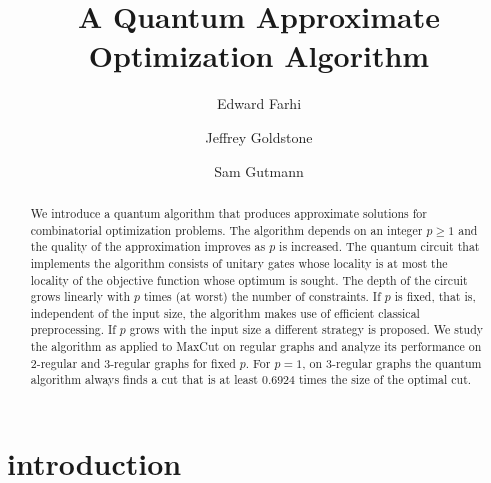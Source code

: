 \documentclass[t11pt,reprint,preprint,preprintnumbers]{revtex4}
\begin{document}
\title{A  Quantum Approximate Optimization Algorithm}
\author{Edward Farhi}
\author{Jeffrey Goldstone}
\author{Sam Gutmann}



\begin{abstract}
We introduce a quantum algorithm that produces approximate solutions for combinatorial optimization problems.  The algorithm depends on an integer $p \geq1$ and the quality of the approximation improves as $p$ is increased. The quantum circuit that implements the algorithm consists of unitary gates whose locality is at most the locality of the objective function whose optimum is sought.  The depth of the circuit grows linearly with $p$ times (at worst) the number of constraints.  If $p$ is fixed, that is, independent of the input size, the algorithm makes use of efficient classical preprocessing.  If $p$ grows with the input size a different strategy is proposed.  We study the algorithm as applied to MaxCut on regular graphs and analyze its performance on 2-regular and 3-regular graphs for fixed $p$.  For $p = 1$, on 3-regular graphs the quantum algorithm always finds a cut that is at least 0.6924 times the size of the optimal cut.  
\end{abstract}

\maketitle

\section{introduction}
\end{document}

